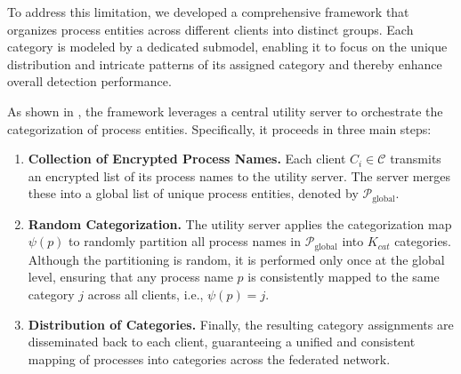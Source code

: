 To address this limitation, we developed a comprehensive framework that organizes process entities across different clients into distinct groups. Each category is modeled by a dedicated submodel, enabling it to focus on the unique distribution and intricate patterns of its assigned category and thereby enhance overall detection performance.

As shown in , the framework leverages a central utility server to orchestrate the categorization of process entities. Specifically, it proceeds in three main steps:
\begin{enumerate}
    \item \textbf{Collection of Encrypted Process Names.} Each client \(C_i \in \mathcal{C}\) transmits an encrypted list of its process names to the utility server. The server merges these into a global list of unique process entities, denoted by \( \mathcal{P}_{\text{global}} \).

    \item \textbf{Random Categorization.} The utility server applies the categorization map \( \psi(p) \) to randomly partition all process names in \( \mathcal{P}_{\text{global}} \) into \( K_{cat} \) categories. Although the partitioning is random, it is performed only once at the global level, ensuring that any process name \( p \) is consistently mapped to the same category \( j \) across all clients, i.e., \( \psi(p) = j \).

    \item \textbf{Distribution of Categories.} Finally, the resulting category assignments are disseminated back to each client, guaranteeing a unified and consistent mapping of processes into categories across the federated network.
\end{enumerate}




